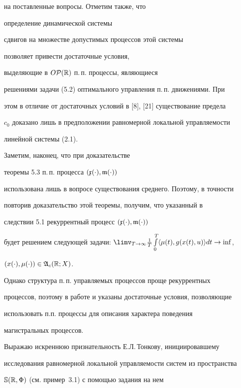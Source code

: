 \begin{notes}
на поставленные вопросы. Отметим также, что


определение динамической системы


сдвигов на множестве допустимых процессов этой системы


позволяет привести достаточные условия,


выделяющие в $O\cal P(\Bbb R)$ п.\,п. процессы, являющиеся


решениями задачи (5.2) оптимального управления п.\,п. движениями. При


этом в отличие от достаточных условий в [8], [21] существование предела


$c_0$ доказано лишь в предположении равномерной локальной управляемости


линейной системы (2.1).


\end{notes}





Заметим, наконец, что при доказательстве


теоремы 5.3 п.\,п. процесса $(\frak x(\cdot),\frak m(\cdot))$


использована лишь в вопросе существования среднего. Поэтому, в точности


повторив доказательство этой теоремы, получим, что указанный в


следствии 5.1 рекуррентный процесс $(\frak x(\cdot),\frak m(\cdot))$


будет решением следующей задачи: $\limv_{T\to\infty}\frac{1}{T}


\int\limits_0^T\langle\mu(t),g(x(t),u)\rangle dt\to\inf$,


$(x(\cdot),\mu(\cdot))\in\frak A_{c}(\Bbb R;X)$.


Однако структура п.\,п. управляемых процессов проще рекуррентных


процессов, поэтому в работе и указаны достаточные условия, позволяющие


использовать п.п. процессы для описания характера поведения


магистральных процессов.





Выражаю искреннюю признательность Е.Л.\,Тонкову, инициировавшему


исследования равномерной локальной управляемости систем из пространства


$\Bbb S(\Bbb R,\Phi)$ (см. пример~3.1) с помощью задания на нем


